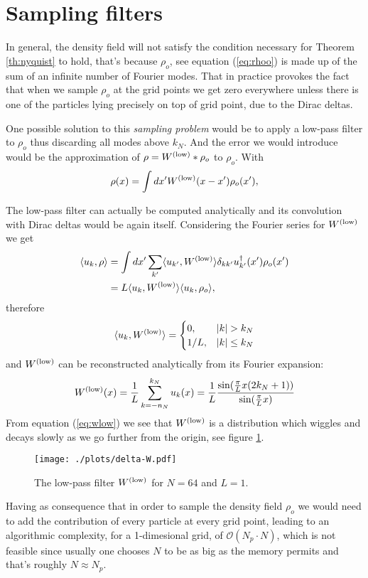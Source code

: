 \section{Sampling filters}

\noindent In general, the density field will not satisfy 
the condition necessary for Theorem \ref{th:nyquist} to hold,
that's because $\rho_o$, see equation (\ref{eq:rhoo}) is
made up of the sum of an infinite number of Fourier modes.
That in practice provokes the fact that when we sample
$\rho_o$ at the grid points we get zero everywhere unless
there is one of the particles lying precisely on top of grid
point, due to the Dirac deltas.

One possible solution to this \emph{sampling problem}
would be to apply a low-pass filter to $\rho_o$
thus discarding all modes above $k_N$.
And the error we would introduce would be the approximation of
$\rho = W^\mathrm{(low)} * \rho_o$ to $\rho_o$. 
With
\begin{equation}
    \rho(x) = \int dx' W^\mathrm{(low)}(x-x') \rho_o(x'),
\end{equation}

The low-pass filter can actually be computed analytically
and its convolution with Dirac deltas would be again itself.
Considering the Fourier series for $W^\mathrm{(low)}$ we get 
\begin{align}
\begin{split}
    \langle u_k, \rho\rangle
    &= \int dx' \sum_{k'} \langle u_{k'},W^\mathrm{(low)} \rangle \delta_{kk'}   u_{k'}^{\dagger}(x') \rho_o(x') \\
    &= L \langle u_{k},W^\mathrm{(low)} \rangle \langle u_{k}, \rho_o \rangle ,
\end{split}
\end{align}
therefore
\begin{equation}
\langle u_{k},\Wlow \rangle = \begin{cases}
    0, & |k|>k_N\\
    1/L, & |k|\le k_N
    \end{cases}
\end{equation}
and $W^\mathrm{(low)}$ can be reconstructed analytically from its Fourier expansion:
\begin{equation}
 W^\mathrm{(low)}(x)
 = \frac{1}{L}\sum_{k=-n_N}^{k_N} u_k(x)
 = \frac{1}{L} \frac{  \sin(\frac{\pi}{L} x (2k_N +1))  }{\sin(\frac{\pi}{L}x)}
 \label{eq:wlow}
\end{equation}
From equation (\ref{eq:wlow}) we see that $W^\mathrm{(low)}$ is a distribution
which wiggles and decays slowly as we go further from the origin,
see figure \ref{fig:wdelta}.
\begin{figure}
    \centering\texttt{[image: ./plots/delta-W.pdf]}
    \caption{The low-pass filter $W^\mathrm{(low)}$ for $N=64$ and $L=1$.}
    \label{fig:wdelta}
\end{figure}
Having as consequence that in order to sample the density field $\rho_o$
we would need to add the contribution
of every particle at every grid point, leading to an 
algorithmic complexity, for a 1-dimesional grid, of $\mathcal{O}(N_p \cdot N)$, which is not feasible
since usually one chooses $N$ to be as big as the memory permits and that's roughly $N\approx N_p$.

